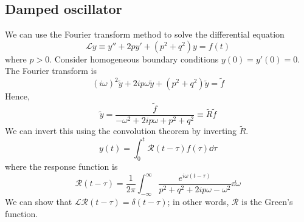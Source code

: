 \subsection{Damped oscillator}
We can use the Fourier transform method to solve the differential equation
\[
	\mathcal L y \equiv y'' + 2py' + (p^2 + q^2)y = f(t)
\]
where \( p > 0 \).
Consider homogeneous boundary conditions \( y(0) = y'(0) = 0 \).
The Fourier transform is
\[
	(i\omega)^2 \widetilde y + 2 i p \omega \widetilde y + (p^2 + q^2) \widetilde y = \widetilde f
\]
Hence,
\[
	\widetilde y = \frac{\widetilde f}{-\omega^2 + 2ip\omega + p^2 + q^2} \equiv \widetilde R \widetilde f
\]
We can invert this using the convolution theorem by inverting \( \widetilde R \).
\[
	y(t) = \int_0^t \mathcal R(t-\tau) f(\tau) \dd{\tau}
\]
where the response function is
\[
	\mathcal R(t - \tau) = \frac{1}{2\pi} \int_{-\infty}^\infty \frac{e^{i\omega(t-\tau)}}{p^2 + q^2 + 2ip\omega - \omega^2} \dd{\omega}
\]
We can show that \( \mathcal L \mathcal R(t-\tau) = \delta(t-\tau) \); in other words, \( \mathcal R \) is the Green's function.
